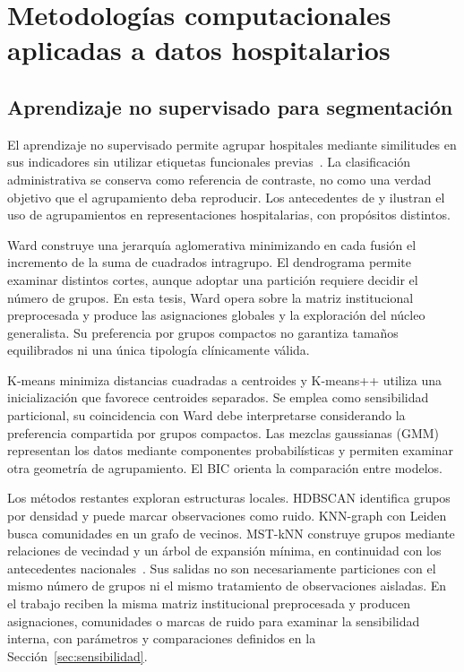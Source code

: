 \section{Metodologías computacionales aplicadas a datos hospitalarios}
\label{sec:metodologias-comp}

\subsection{Aprendizaje no supervisado para segmentación}
\label{sec:clustering}

El aprendizaje no supervisado permite agrupar hospitales mediante similitudes
en sus indicadores sin utilizar etiquetas funcionales previas~\citep{Jain2010}. La clasificación
administrativa se conserva como referencia de contraste, no como una verdad
objetivo que el agrupamiento deba reproducir. Los antecedentes de
\citet{Chrusciel2021} y \citet{Liu2025} ilustran el uso de agrupamientos en
representaciones hospitalarias, con propósitos distintos.

Ward construye una jerarquía aglomerativa minimizando en cada fusión el
incremento de la suma de cuadrados intragrupo. El dendrograma permite examinar
distintos cortes, aunque adoptar una partición requiere decidir el número de
grupos. En esta tesis, Ward opera sobre la matriz institucional preprocesada y
produce las asignaciones globales y la exploración del núcleo generalista.
Su preferencia por grupos compactos no garantiza tamaños equilibrados ni una
única tipología clínicamente válida.

K-means minimiza distancias cuadradas a centroides y K-means++ utiliza una
inicialización que favorece centroides separados. Se emplea como sensibilidad
particional, su coincidencia con Ward debe interpretarse considerando la
preferencia compartida por grupos compactos. Las mezclas gaussianas (GMM)
representan los datos mediante componentes probabilísticas y permiten examinar
otra geometría de agrupamiento. El BIC orienta la comparación entre modelos.

Los métodos restantes exploran estructuras locales. HDBSCAN identifica grupos
por densidad y puede marcar observaciones como ruido. KNN-graph con Leiden
busca comunidades en un grafo de vecinos. MST-kNN construye grupos mediante
relaciones de vecindad y un árbol de expansión mínima, en continuidad con los
antecedentes nacionales~\citep{inostroza2008, Villalobos2016}. Sus salidas no
son necesariamente particiones con el mismo número de grupos ni el mismo
tratamiento de observaciones aisladas. En el trabajo reciben la misma matriz institucional preprocesada y producen
asignaciones, comunidades o marcas de ruido para examinar la sensibilidad
interna, con parámetros y comparaciones definidos en la
Sección~\ref{sec:sensibilidad}.

